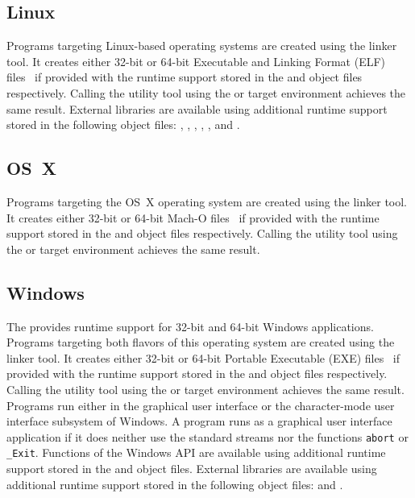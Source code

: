 \subsection{Linux}

Programs targeting Linux-based operating systems are created using the  linker tool.
It creates either 32-bit or 64-bit Executable and Linking Format (ELF) files~\cite{elffile} if provided with the runtime support stored in the  and  object files respectively.
Calling the  utility tool using the  or  target environment achieves the same result.
External libraries are available using additional runtime support stored in the following object files: , , , , , and .

\subsection{OS~X}

Programs targeting the OS~X operating system are created using the  linker tool.
It creates either 32-bit or 64-bit Mach-O files~\cite{machofile} if provided with the runtime support stored in the  and  object files respectively.
Calling the  utility tool using the  or  target environment achieves the same result.

\subsection{Windows}

The \ecs{} provides runtime support for 32-bit and 64-bit Windows applications.
Programs targeting both flavors of this operating system are created using the  linker tool.
It creates either 32-bit or 64-bit Portable Executable (EXE) files~\cite{exefile} if provided with the runtime support stored in the  and  object files respectively.
Calling the  utility tool using the  or  target environment achieves the same result.
Programs run either in the graphical user interface or the character-mode user interface subsystem of Windows.
A program runs as a graphical user interface application if it does neither use the standard streams nor the functions \texttt{abort} or \texttt{\_Exit}.
Functions of the Windows API are available using additional runtime support stored in the  and  object files.
External libraries are available using additional runtime support stored in the following object files:  and .

